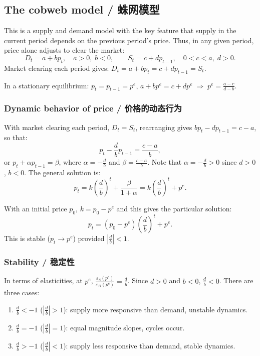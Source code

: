 \subsection{The cobweb model / 蛛网模型}

\begin{original}
This is a supply and demand model with the key feature that supply in the current period depends on the previous period's price. Thus, in any given period, price alone adjusts to clear the market:
\[
D_t = a + b p_t, \quad a > 0,\; b < 0,\qquad S_t = c + d p_{t-1}, \quad 0 < c < a,\; d > 0.
\]
Market clearing each period gives: $D_t = a + b p_t = c + d p_{t-1} = S_t$.

In a stationary equilibrium: $p_t = p_{t-1} = p^e$, $a + b p^e = c + d p^e \;\Rightarrow\; p^e = \frac{a-c}{d-b}$.

\subsubsection{Dynamic behavior of price / 价格的动态行为}

With market clearing each period, $D_t = S_t$, rearranging gives $b p_t - d p_{t-1} = c - a$, so that:
\[
p_t - \frac{d}{b} p_{t-1} = \frac{c-a}{b},
\]
or $p_t + \alpha p_{t-1} = \beta$, where $\alpha = -\frac{d}{b}$ and $\beta = \frac{c-a}{b}$. Note that $\alpha = -\frac{d}{b} > 0$ since $d > 0$, $b < 0$. The general solution is:
\[
p_t = k\left(\frac{d}{b}\right)^t + \frac{\beta}{1+\alpha} = k\left(\frac{d}{b}\right)^t + p^e.
\]

With an initial price $p_0$, $k = p_0 - p^e$ and this gives the particular solution:
\[
p_t = (p_0 - p^e)\left(\frac{d}{b}\right)^t + p^e.
\]
This is stable ($p_t \to p^e$) provided $\left|\frac{d}{b}\right| < 1$.

\subsubsection{Stability / 稳定性}

In terms of elasticities, at $p^e$, $\frac{\varepsilon_S(p^e)}{\varepsilon_D(p^e)} = \frac{d}{b}$. Since $d > 0$ and $b < 0$, $\frac{d}{b} < 0$. There are three cases:
\begin{enumerate}
\item $\frac{d}{b} < -1$ ($|\frac{d}{b}| > 1$): supply more responsive than demand, unstable dynamics.
\item $\frac{d}{b} = -1$ ($|\frac{d}{b}| = 1$): equal magnitude slopes, cycles occur.
\item $\frac{d}{b} > -1$ ($|\frac{d}{b}| < 1$): supply less responsive than demand, stable dynamics.
\end{enumerate}
\end{original}
